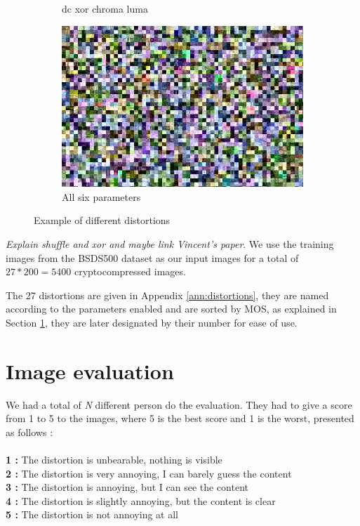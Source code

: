 \documentclass{article}
\begin{document}
\begin{figure}[ht]
\begin{subfigure}{4.3cm}
  \caption{dc xor chroma luma}
  \label{fig:sub1}
\end{subfigure}%
\begin{subfigure}{4.3cm}
  \centering
  \includegraphics[width=0.9\linewidth]{figures/ac_dc_shuffle_xor_chrominance_luminance_76_140055}
  \caption{All six parameters}
  \label{fig:sub2}
\end{subfigure}

\caption{Example of different distortions}
\label{fig:images}
\end{figure}

\textit{Explain shuffle and xor and maybe link Vincent's paper}. We use the training images from the BSDS500 \cite{bsds500} dataset as our input images for a total of $27 * 200 = 5400$ cryptocompressed images.

The 27 distortions are given in Appendix \ref{ann:distortions}, they are named according to the parameters enabled and are sorted by MOS, as explained in Section \ref{sec:evaluation}, they are later designated by their number for ease of use.

\section{Image evaluation}
\label{sec:evaluation}
We had a total of \textit{N} different person do the evaluation. They had to give a score from 1 to 5 to the images, where 5 is the best score and 1 is the worst, presented as follows :\\\\
\textbf{1 :} The distortion is unbearable, nothing is visible\\
\textbf{2 :} \small{The distortion is very annoying, I can barely guess the content}\normalsize{}\\
\textbf{3 :} The distortion is annoying, but I can see the content\\
\textbf{4 :} The distortion is slightly annoying, but the content is clear\\
\textbf{5 :} The distortion is not annoying at all \\
\end{document}
